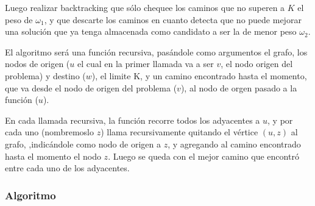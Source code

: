 Luego realizar backtracking que s\'olo chequee los caminos que no superen a $K$ el peso de $\omega_1$, y que descarte los caminos en cuanto
detecta que no puede mejorar una soluci\'on que ya tenga almacenada como candidato a ser la de menor peso $\omega_2$.

El algoritmo ser\'a una funci\'on recursiva, pas\'andole como argumentos el grafo, los nodos de origen ($u$ el cual en la primer llamada va a ser $v$,
el nodo origen del problema) y destino ($w$), el limite K, y un camino encontrado hasta el momento, que va desde el nodo de origen del problema ($v$), al nodo de orgen pasado a la funci\'on ($u$).

En cada llamada recursiva, la funci\'on recorre todos los adyacentes a $u$, y por cada uno (nombremoslo $z$) llama recursivamente quitando el v\'ertice $(u,z)$ al grafo,
,indic\'andole como nodo de origen a $z$, y agregando al camino encontrado hasta el momento el nodo $z$. Luego se queda con el mejor camino que encontr\'o entre cada uno de los adyacentes.

\subsubsection{Algoritmo}

